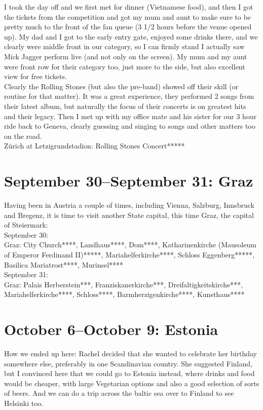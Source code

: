 I took the day off and we first met for dinner (Vietnamese food), and then I got the tickets from the competition and got my mum and aunt to make sure to be pretty much to the front of the fan queue (3 1/2 hours before the venue opened up). My dad and I got to the early entry gate, enjoyed some drinks there, and we clearly were middle front in our category, so I can firmly stand I actually saw Mick Jagger perform live (and not only on the screen). My mum and my aunt were front row for their category too, just more to the side, but also excellent view for free tickets.\\
Clearly the Rolling Stones (but also the pre-band) showed off their skill (or routine for that matter). It was a great experience, they performed 2 songs from their latest album, but naturally the focus of their concerts is on greatest hits and their legacy. Then I met up with my office mate and his sister for our 3 hour ride back to Geneva, clearly guessing and singing to songs and other matters too on the road.\\

Z\"urich at Letzigrundstadion: Rolling Stones Concert*****

\section{September 30--September 31: Graz}
\label{Graz2017}

Having been in Austria a couple of times, including Vienna, Salzburg, Innsbruck and Bregenz, it is time to visit another State capital, this time Graz, the capital of Steiermark:\\

September 30:\\
Graz: City Church****, Landhaus****, Dom****, Katharinenkirche (Mausoleum of Emperor Ferdinand II)*****, Mariahelferkirche****, Schloss Eggenberg*****, Basilica Mariatrost****, Murinsel****\\

September 31:\\
Graz: Palais Herberstein***, Franziskanerkirche***, Dreifaltigkeitskirche***, Mariahelferkirche****, Schloss****, Barmherzigenkirche****, Kunsthaus****

\section{October 6--October 9: Estonia}
\label{Estonia2017}

How we ended up here: Rachel decided that she wanted to celebrate her birthday somewhere else, preferably in one Scandinavian country. She suggested Finland, but I convinced here that we could go to Estonia instead, where drinks and food would be cheaper, with large Vegetarian options and also a good selection of sorts of beers. And we can do a trip across the baltic sea over to Finland to see Helsinki too.\\

